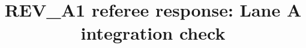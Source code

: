 \documentclass[11pt,reqno]{amsart}
\theoremstyle{plain}
\theoremstyle{definition}
\theoremstyle{remark}
\numberwithin{equation}{section}
\begin{document}
\title{REV\_A1 referee response: Lane A integration check}
\date{}
\maketitle

\setcounter{section}{2}


\appendix

\end{document}
